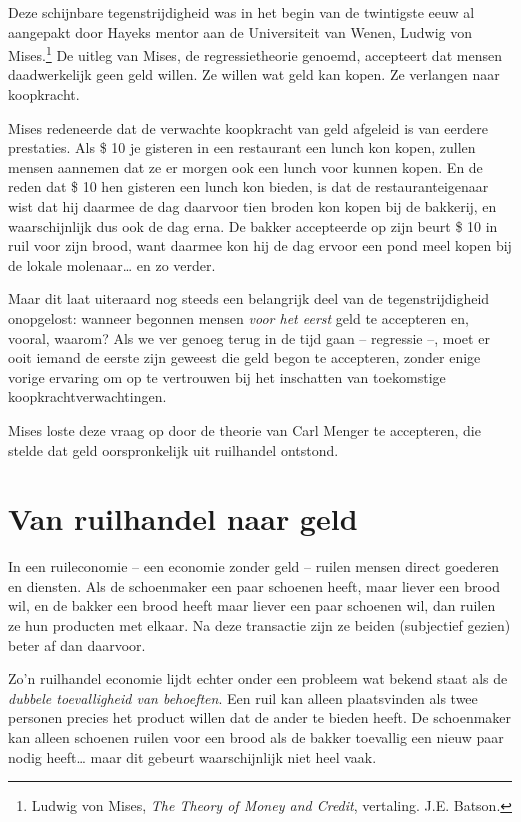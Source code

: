 \documentclass[
  a5paper,
  smalldemyvopaper,11pt,twoside,onecolumn,openright,extrafontsizes,
hidelinks]{memoir}
\begin{document}
Deze schijnbare tegenstrijdigheid was in het begin van de twintigste
eeuw al aangepakt door Hayeks mentor aan de Universiteit van Wenen,
Ludwig von Mises.\footnote{\hspace{0pt}Ludwig von Mises, \emph{The
  Theory of Money and Credit}, vertaling. J.E. Batson.} De uitleg van
Mises, de regressietheorie genoemd, accepteert dat mensen daadwerkelijk
geen geld willen. Ze willen wat geld kan kopen. Ze verlangen naar
koopkracht.

Mises redeneerde dat de verwachte koopkracht van geld afgeleid is van
eerdere prestaties. Als \$ 10 je gisteren in een restaurant een lunch
kon kopen, zullen mensen aannemen dat ze er morgen ook een lunch voor
kunnen kopen. En de reden dat \$ 10 hen gisteren een lunch kon bieden,
is dat de restauranteigenaar wist dat hij daarmee de dag daarvoor tien
broden kon kopen bij de bakkerij, en waarschijnlijk dus ook de dag erna.
De bakker accepteerde op zijn beurt \$ 10 in ruil voor zijn brood, want
daarmee kon hij de dag ervoor een pond meel kopen bij de lokale
molenaar\ldots{} en zo verder.

Maar dit laat uiteraard nog steeds een belangrijk deel van de
tegenstrijdigheid onopgelost: wanneer begonnen mensen \emph{voor het
eerst} geld te accepteren en, vooral, waarom? Als we ver genoeg terug in
de tijd gaan -- regressie --, moet er ooit iemand de eerste zijn geweest
die geld begon te accepteren, zonder enige vorige ervaring om op te
vertrouwen bij het inschatten van toekomstige koopkrachtverwachtingen.

Mises loste deze vraag op door de theorie van Carl Menger te accepteren,
die stelde dat geld oorspronkelijk uit ruilhandel ontstond.

\section{Van ruilhandel naar geld}\label{van-ruilhandel-naar-geld}

In een ruileconomie -- een economie zonder geld -- ruilen mensen direct
goederen en diensten. Als de schoenmaker een paar schoenen heeft, maar
liever een brood wil, en de bakker een brood heeft maar liever een paar
schoenen wil, dan ruilen ze hun producten met elkaar. Na deze transactie
zijn ze beiden (subjectief gezien) beter af dan daarvoor.

Zo'n ruilhandel economie lijdt echter onder een probleem wat bekend
staat als de \emph{dubbele toevalligheid van behoeften}. Een ruil kan
alleen plaatsvinden als twee personen precies het product willen dat de
ander te bieden heeft. De schoenmaker kan alleen schoenen ruilen voor
een brood als de bakker toevallig een nieuw paar nodig heeft\ldots{}
maar dit gebeurt waarschijnlijk niet heel vaak.
\end{document}
